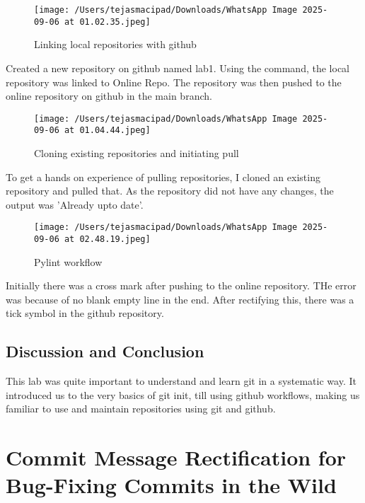 \documentclass[12pt, a4paper]{report}
\begin{document}
\begin{figure}[!h]
    \centering
    \texttt{[image: /Users/tejasmacipad/Downloads/WhatsApp Image 2025-09-06 at 01.02.35.jpeg]}
    \caption{Linking local repositories with github}
    \label{fig:lab4}
\end{figure}

Created a new repository on github named lab1. Using the command, the local repository was linked to Online Repo.
The repository was then pushed to the online repository on github in the main branch.

\begin{figure}[!h]
    \centering
    \texttt{[image: /Users/tejasmacipad/Downloads/WhatsApp Image 2025-09-06 at 01.04.44.jpeg]}
    \caption{Cloning existing repositories and initiating pull}
    \label{fig:lab5}
\end{figure}

To get a hands on experience of pulling repositories, I cloned an existing repository and pulled that. As the repository did not have any changes, the output was 'Already upto date'.

\newpage

\begin{figure}[!h]
    \centering
    \texttt{[image: /Users/tejasmacipad/Downloads/WhatsApp Image 2025-09-06 at 02.48.19.jpeg]}
    \caption{Pylint workflow}
    \label{fig:lab6}
\end{figure}

Initially there was a cross mark after pushing to the online repository. THe error was because of no blank empty line in the end.
\newline
After rectifying this, there was a tick symbol in the github repository.

\section{Discussion and Conclusion}
This lab was quite important to understand and learn git in a systematic way. It introduced us to the very basics of git init, till using github workflows, making us familiar to use and maintain repositories using git and github.

\cleardoublepage


\chapter{Commit Message Rectification for Bug-Fixing Commits in the Wild}
\end{document}
